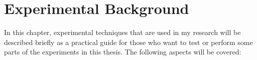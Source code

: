 

\chapter{Experimental Background}
\label{experimental-background}
In this chapter, experimental techniques that are used in my research will be described briefly as a practical guide for those who want to test or perform some parts of the experiments in this thesis. The following aspects will be covered:
